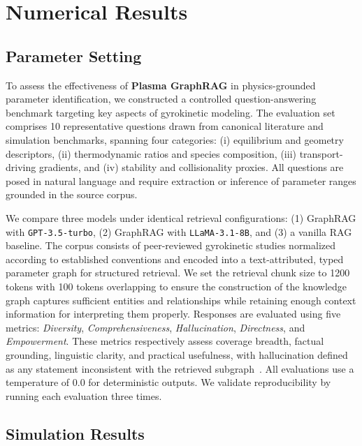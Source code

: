 \documentclass[journal]{IEEEtran}
\begin{document}
\section{Numerical Results}


\subsection{Parameter Setting}

{To assess the effectiveness of \textbf{Plasma GraphRAG} in physics-grounded parameter identification, we constructed a controlled question-answering benchmark targeting key aspects of gyrokinetic modeling. The evaluation set comprises 10 representative questions drawn from canonical literature and simulation benchmarks, spanning four categories: (i) equilibrium and geometry descriptors, (ii) thermodynamic ratios and species composition, (iii) transport-driving gradients, and (iv) stability and collisionality proxies. All questions are posed in natural language and require extraction or inference of parameter ranges grounded in the source corpus.}

We compare three models under identical retrieval configurations: (1) GraphRAG with \texttt{GPT-3.5-turbo}, (2) GraphRAG with \texttt{LLaMA-3.1-8B}, and (3) a vanilla RAG baseline. The corpus consists of peer-reviewed gyrokinetic studies normalized according to established conventions and encoded into a text-attributed, typed parameter graph for structured retrieval. {We set the retrieval chunk size to 1200 tokens with 100 tokens overlapping to ensure the construction of the knowledge graph captures sufficient entities and relationships while retaining enough context information for interpreting them properly.} Responses are evaluated using five metrics: \emph{Diversity}, \emph{Comprehensiveness}, \emph{Hallucination}, \emph{Directness}, and \emph{Empowerment}. {These metrics respectively assess coverage breadth, factual grounding, linguistic clarity, and practical usefulness, with hallucination defined as any statement inconsistent with the retrieved subgraph}~\cite{yu2024evaluation}. {All evaluations use a temperature of 0.0 for deterministic outputs. We validate reproducibility by running each evaluation three times.}


\subsection{Simulation Results}
\end{document}
